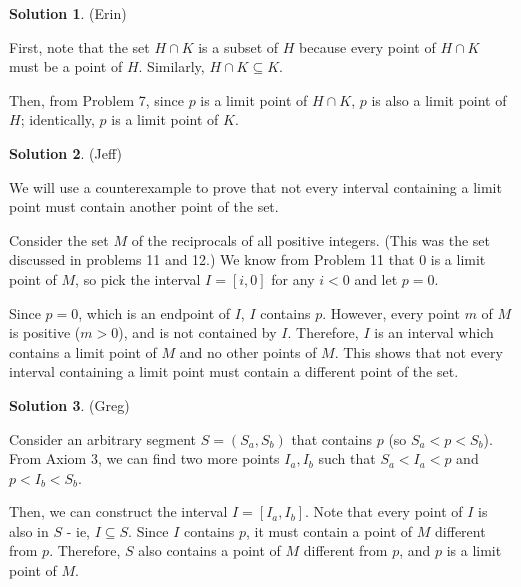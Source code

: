 \documentclass{article}
\theoremstyle{definition}
\newtheorem{solution}{Solution}
\begin{document}
\begin{solution} %
(Erin)

First, note that the set $H \cap K$ is a subset of $H$ because every point of $H \cap K$ must be a point of $H$.
Similarly, $H \cap K \subseteq K$.

Then, from Problem 7, since $p$ is a limit point of $H \cap K$, $p$ is also a limit point of $H$; identically, $p$ is a limit point of $K$.
\end{solution}

\begin{solution} %
(Jeff)

We will use a counterexample to prove that not every interval containing a limit point must contain another point of the set.

Consider the set $M$ of the reciprocals of all positive integers.
(This was the set discussed in problems 11 and 12.)
We know from Problem 11 that $0$ is a limit point of $M$, so pick the interval $I = [i, 0]$ for any $i < 0$ and let $p = 0$.

Since $p = 0$, which is an endpoint of $I$, $I$ contains $p$.
However, every point $m$ of $M$ is positive ($m > 0$), and is not contained by $I$.
Therefore, $I$ is an interval which contains a limit point of $M$ and no other points of $M$.
This shows that not every interval containing a limit point must contain a different point of the set.
\end{solution}

\begin{solution} %
(Greg)

Consider an arbitrary segment $S = (S_a, S_b)$ that contains $p$ (so $S_a < p < S_b$).
From Axiom 3, we can find two more points $I_a, I_b$ such that $S_a < I_a < p$ and $p < I_b < S_b$.

Then, we can construct the interval $I = [I_a, I_b]$.
Note that every point of $I$ is also in $S$ - ie, $I \subseteq S$.
Since $I$ contains $p$, it must contain a point of $M$ different from $p$.
Therefore, $S$ also contains a point of $M$ different from $p$, and $p$ is a limit point of $M$.
\end{solution}
\end{document}
